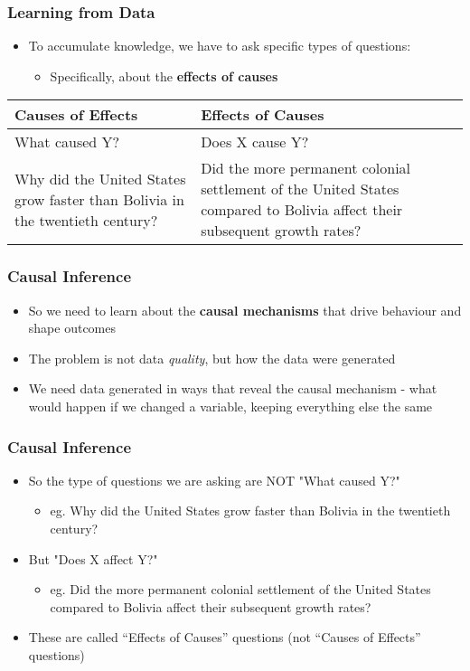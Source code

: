 \documentclass[xcolor=x11names,compress]{beamer}\usepackage[]{graphicx}\usepackage[]{color}
\renewcommand{\(}{\begin{columns}}
\renewcommand{\)}{\end{columns}}
\newcommand{\<}[1]{\begin{column}{#1}}
\renewcommand{\>}{\end{column}}
\begin{document}
\begin{frame}
\frametitle{Learning from Data}
\begin{itemize}
\item To accumulate knowledge, we have to ask specific types of questions:
\pause
\begin{itemize}
\item Specifically, about the \textbf{effects of causes}
\pause
\end{itemize}
\end{itemize}
\begin{table}[htbp]
  \centering
    \begin{tabular}{|>{\raggedright}p{5cm}|p{5cm}|}
    \toprule
    \textbf{Causes of Effects} & \textbf{Effects of Causes} \\
    \midrule
    What caused Y? & Does X cause Y? \\
    \midrule
    Why did the United States grow faster than Bolivia in the twentieth century? & Did the more permanent colonial settlement of the United States compared to Bolivia affect their subsequent growth rates? \\
    \bottomrule
    \end{tabular}%
  \label{tab:addlabel}%
\end{table}%
\end{frame}


\begin{frame}
\frametitle{Causal Inference}
\begin{itemize}
\item So we need to learn about the \textbf{causal mechanisms} that drive behaviour and shape outcomes
\item The problem is not data \textit{quality}, but how the data were generated
\item We need data generated in ways that reveal the causal mechanism - what would happen if we changed a variable, keeping everything else the same
\end{itemize}
\end{frame}



\begin{frame}
\frametitle{Causal Inference}
\begin{itemize}
\item So the type of questions we are asking are NOT "What caused Y?"
\begin{itemize}
\item eg. Why did the United States grow faster than Bolivia in the twentieth century?
\end{itemize}
\item But "Does X affect Y?"
\begin{itemize}
\item eg. Did the more permanent colonial settlement of the United States compared to Bolivia affect their subsequent growth rates? 
\end{itemize}
\item These are called ``Effects of Causes'' questions (not ``Causes of Effects'' questions)
\end{itemize}
\end{frame}
\end{document}
